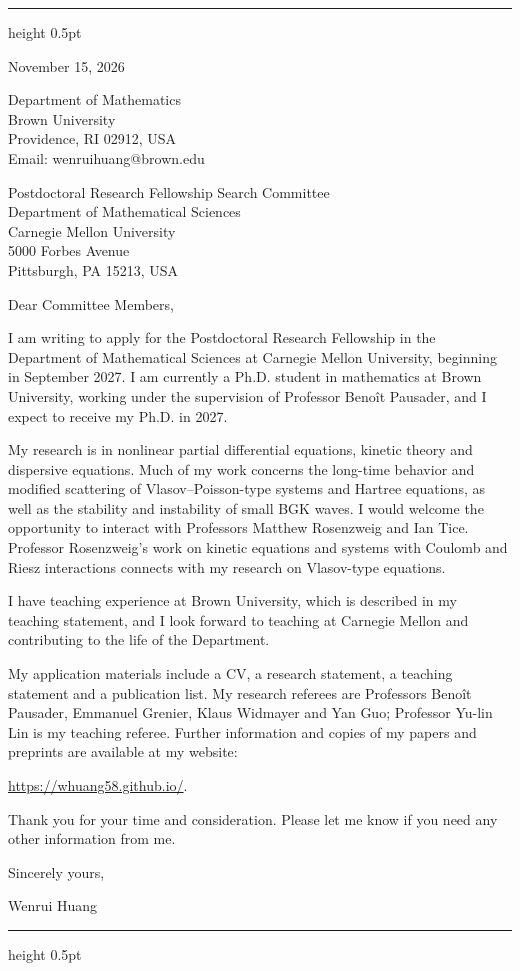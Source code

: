\documentclass[10pt]{article}
\begin{document}
\vspace{0.08in}
\hrule height 0.5pt

\vspace{0.47in}
\hfill
\begin{minipage}{2.27in}
November 15, 2026

\vspace{0.16in}
Department of Mathematics\\
Brown University\\
Providence, RI 02912, USA\\
Email: wenrui\textunderscore huang@brown.edu
\end{minipage}

\vspace{0.30in}
Postdoctoral Research Fellowship Search Committee\\
Department of Mathematical Sciences\\
Carnegie Mellon University\\
5000 Forbes Avenue\\
Pittsburgh, PA 15213, USA

\vspace{0.16in}
Dear Committee Members,

I am writing to apply for the Postdoctoral Research Fellowship in the Department of Mathematical Sciences at Carnegie Mellon University, beginning in September 2027. I am currently a Ph.D. student in mathematics at Brown University, working under the supervision of Professor Beno\^{i}t Pausader, and I expect to receive my Ph.D. in 2027.

My research is in nonlinear partial differential equations, kinetic theory and dispersive equations. Much of my work concerns the long-time behavior and modified scattering of Vlasov--Poisson-type systems and Hartree equations, as well as the stability and instability of small BGK waves. I would welcome the opportunity to interact with Professors Matthew Rosenzweig and Ian Tice. Professor Rosenzweig's work on kinetic equations and systems with Coulomb and Riesz interactions connects with my research on Vlasov-type equations.

I have teaching experience at Brown University, which is described in my teaching statement, and I look forward to teaching at Carnegie Mellon and contributing to the life of the Department.

My application materials include a CV, a research statement, a teaching statement and a publication list. My research referees are Professors Beno\^{i}t Pausader, Emmanuel Grenier, Klaus Widmayer and Yan Guo; Professor Yu-lin Lin is my teaching referee. Further information and copies of my papers and preprints are available at my website:

\url{https://whuang58.github.io/}.

\medskip
Thank you for your time and consideration. Please let me know if you need any other information from me.

\vspace{0.12in}
Sincerely yours,

\vspace{0.12in}
Wenrui Huang

\vfill
\hrule height 0.5pt
\end{document}

